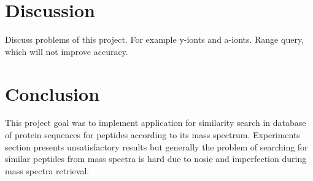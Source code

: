 \documentclass[a4paper,10pt,twocolumn]{article}
\begin{document}
\section{Discussion}

Discuss problems of this project. For example y-ionts and a-ionts.
Range query, which will not improve accuracy.

\section{Conclusion}

This project goal was to implement application for similarity search in
database of protein sequences for peptides according to its mass spectrum.
Experiments section presents unsatisfactory results but generally the problem
of searching for similar peptides from mass spectra is hard due to nosie and
imperfection during mass spectra retrieval.

{}

\end{document}
